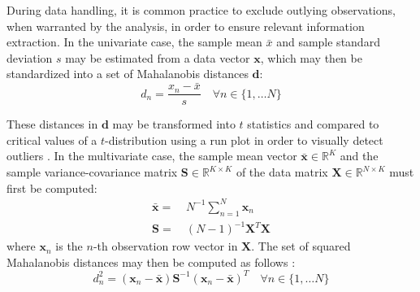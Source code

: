 \begin{doublespace}
During data handling, it is common practice to exclude outlying observations,
when warranted by the analysis, in order to ensure relevant information
extraction. In the univariate case, the sample mean $\bar{x}$ and sample
standard deviation $s$ may be estimated from a data vector $\mathbf{x}$,
which may then be standardized into a set of Mahalanobis distances
$\mathbf{d}$:
\begin{equation}
d_n = \frac{x_n - \bar{x}}{s}
 \quad \forall n \in \{1, \dots N\}
\end{equation}

These distances in $\mathbf{d}$ may be transformed into $t$ statistics and
compared to critical values of a $t$-distribution using a run plot in order
to visually detect outliers \cite{chambers1983}. In the multivariate case,
the sample mean vector $\bar{\mathbf{x}} \in \mathbb{R}^K$ and the sample
variance-covariance matrix $\mathbf{S} \in \mathbb{R}^{K \times K}$ of the
data matrix $\mathbf{X} \in \mathbb{R}^{N \times K}$ must first be computed:
\begin{align}
\bar{\mathbf{x}} =& \: N^{-1} \sum_{n=1}^N \mathbf{x}_n \\
\mathbf{S} =& \: (N - 1)^{-1} \mathbf{X}^T \mathbf{X}
\end{align}
where $\mathbf{x}_n$ is the $n$-th observation row vector in $\mathbf{X}$.
The set of squared Mahalanobis distances may then be computed as follows
\cite{demaesschalck:cils2000}:
\begin{equation}
d_n^2 =
 (\mathbf{x}_n - \bar{\mathbf{x}}) \mathbf{S}^{-1}
 (\mathbf{x}_n - \bar{\mathbf{x}})^T
 \quad \forall n \in \{1, \dots N\}
\end{equation}


\end{doublespace}
